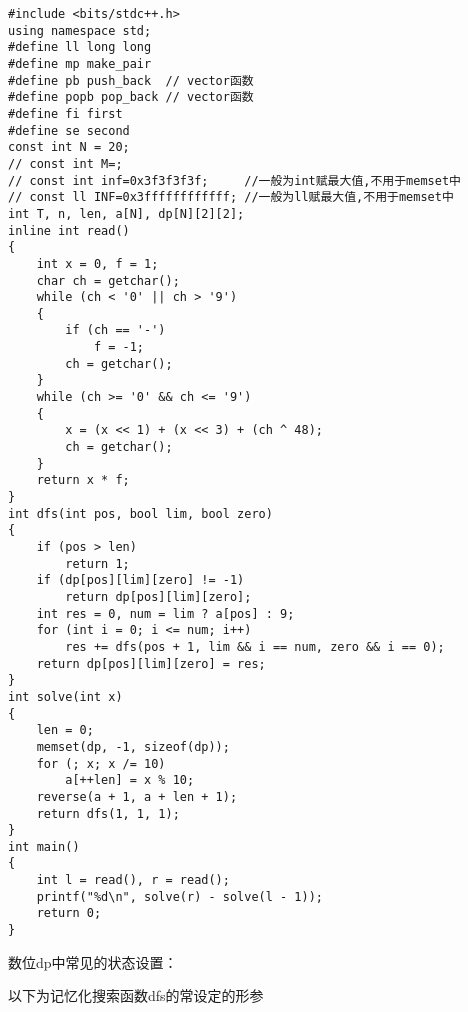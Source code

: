\documentclass[]{article}
\begin{document}
\begin{verbatim}
#include <bits/stdc++.h>
using namespace std;
#define ll long long
#define mp make_pair
#define pb push_back  // vector函数
#define popb pop_back // vector函数
#define fi first
#define se second
const int N = 20;
// const int M=;
// const int inf=0x3f3f3f3f;     //一般为int赋最大值,不用于memset中
// const ll INF=0x3ffffffffffff; //一般为ll赋最大值,不用于memset中
int T, n, len, a[N], dp[N][2][2];
inline int read()
{
    int x = 0, f = 1;
    char ch = getchar();
    while (ch < '0' || ch > '9')
    {
        if (ch == '-')
            f = -1;
        ch = getchar();
    }
    while (ch >= '0' && ch <= '9')
    {
        x = (x << 1) + (x << 3) + (ch ^ 48);
        ch = getchar();
    }
    return x * f;
}
int dfs(int pos, bool lim, bool zero)
{
    if (pos > len)
        return 1;
    if (dp[pos][lim][zero] != -1)
        return dp[pos][lim][zero];
    int res = 0, num = lim ? a[pos] : 9;
    for (int i = 0; i <= num; i++)
        res += dfs(pos + 1, lim && i == num, zero && i == 0);
    return dp[pos][lim][zero] = res;
}
int solve(int x)
{
    len = 0;
    memset(dp, -1, sizeof(dp));
    for (; x; x /= 10)
        a[++len] = x % 10;
    reverse(a + 1, a + len + 1);
    return dfs(1, 1, 1);
}
int main()
{
    int l = read(), r = read();
    printf("%d\n", solve(r) - solve(l - 1));
    return 0;
}
\end{verbatim}

数位dp中常见的状态设置：

以下为记忆化搜索函数dfs的常设定的形参
\end{document}
